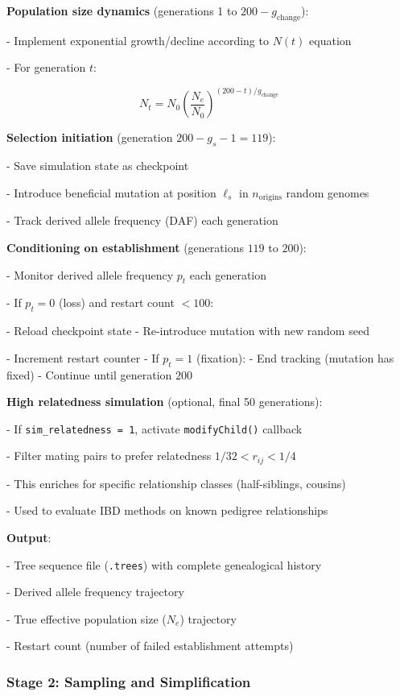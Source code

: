 \documentclass[
  11pt,
]{article}
\begin{document}
\textbf{Population size dynamics} (generations 1 to
\(200 - g_{\text{change}}\)):

- Implement exponential growth/decline according to \(N(t)\) equation

- For generation \(t\):

\[N_t = N_0 \left(\frac{N_e}{N_0}\right)^{(200-t)/g_{\text{change}}}\]

\textbf{Selection initiation} (generation \(200 - g_s - 1 = 119\)):

- Save simulation state as checkpoint

- Introduce beneficial mutation at position \(\ell_s\) in
\(n_{\text{origins}}\) random genomes

- Track derived allele frequency (DAF) each generation

\textbf{Conditioning on establishment} (generations \(119\) to \(200\)):

- Monitor derived allele frequency \(p_t\) each generation

- If \(p_t = 0\) (loss) and restart count \(< 100\):

- Reload checkpoint state - Re-introduce mutation with new random seed

- Increment restart counter - If \(p_t = 1\) (fixation): - End tracking
(mutation has fixed) - Continue until generation \(200\)

\textbf{High relatedness simulation} (optional, final 50 generations):

- If \texttt{sim\_relatedness\ =\ 1}, activate \texttt{modifyChild()}
callback

- Filter mating pairs to prefer relatedness \(1/32 < r_{ij} < 1/4\)

- This enriches for specific relationship classes (half-siblings,
cousins)

- Used to evaluate IBD methods on known pedigree relationships

\textbf{Output}:

- Tree sequence file (\texttt{.trees}) with complete genealogical
history

- Derived allele frequency trajectory

- True effective population size (\(N_e\)) trajectory

- Restart count (number of failed establishment attempts)

\subsubsection{Stage 2: Sampling and
Simplification}\label{stage-2-sampling-and-simplification}
\end{document}
